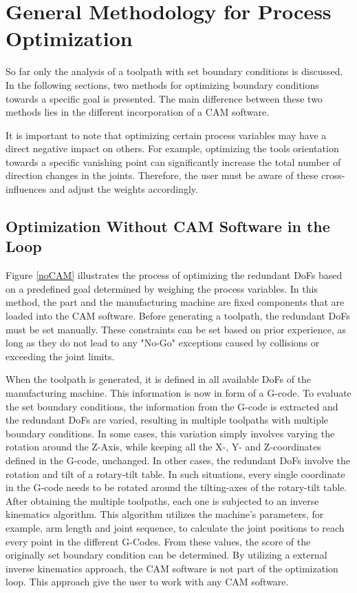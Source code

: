 \newpage
\section{General Methodology for Process Optimization}
So far only the analysis of a toolpath with set boundary conditions is discussed. In the following sections, two methods for optimizing boundary conditions towards a specific goal is presented. The main difference between these two methods lies in the different incorporation of a \acrshort{CAM} software.

It is important to note that optimizing certain process variables may have a direct negative impact on others. For example, optimizing the tools orientation towards a specific vanishing point can significantly increase the total number of direction changes in the joints. Therefore, the user must be aware of these cross-influences and adjust the weights accordingly.

\subsection{Optimization Without CAM Software in the Loop}\label{noCAMchap}

Figure \ref{noCAM} illustrates the process of optimizing the redundant \acrshort{DoF}s based on a predefined goal determined by weighing the process variables. In this method, the part and the manufacturing machine are fixed components that are loaded into the \acrshort{CAM} software. Before generating a toolpath, the redundant \acrshort{DoF}s must be set manually. These constraints can be set based on prior experience, as long as they do not lead to any "No-Go" exceptions caused by collisions or exceeding the joint limits.

When the toolpath is generated, it is defined in all available \acrshort{DoF}s of the manufacturing machine. This information is now in form of a G-code. To evaluate the set boundary conditions, the information from the G-code is extracted and the redundant \acrshort{DoF}s are varied, resulting in multiple toolpaths with multiple boundary conditions. In some cases, this variation simply involves varying the rotation around the Z-Axis, while keeping all the X-, Y- and Z-coordinates defined in the G-code, unchanged. In other cases, the redundant \acrshort{DoF}s involve the rotation and tilt of a rotary-tilt table. In such situations, every single coordinate in the G-code needs to be rotated around the tilting-axes of the rotary-tilt table. After obtaining the multiple toolpaths, each one is subjected to an inverse kinematics algorithm. This algorithm utilizes the machine's parameters, for example, arm length and joint sequence, to calculate the joint positions to reach every point in the different G-Codes. From these values, the score of the originally set boundary condition can be determined. By utilizing a external inverse kinematics approach, the \acrshort{CAM} software is not part of the optimization loop. This approach give  the user to work with any \acrshort{CAM} software.  

